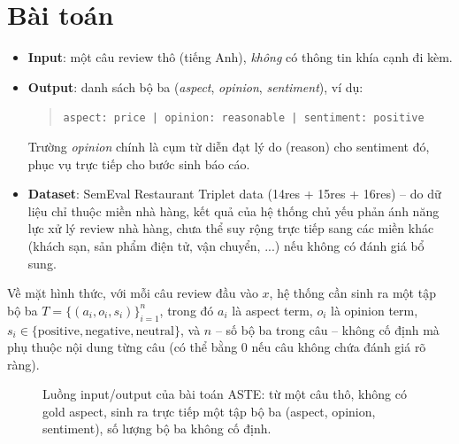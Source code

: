 \documentclass[11pt,a4paper]{article}
\begin{document}
\clearpage
\section{Bài toán}
\label{sec:problem}

\begin{itemize}
    \item \textbf{Input}: một câu review thô (tiếng Anh), \emph{không} có
        thông tin khía cạnh đi kèm.
    \item \textbf{Output}: danh sách bộ ba
        (\emph{aspect}, \emph{opinion}, \emph{sentiment}), ví dụ:
        \begin{quote}
        \texttt{aspect: price | opinion: reasonable | sentiment: positive}
        \end{quote}
        Trường \emph{opinion} chính là cụm từ diễn đạt lý do (reason)
        cho sentiment đó, phục vụ trực tiếp cho bước sinh báo cáo.
    \item \textbf{Dataset}: SemEval Restaurant Triplet data (14res +
        15res + 16res) -- do dữ liệu chỉ thuộc miền nhà hàng, kết quả của
        hệ thống chủ yếu phản ánh năng lực xử lý review nhà hàng, chưa
        thể suy rộng trực tiếp sang các miền khác (khách sạn, sản phẩm
        điện tử, vận chuyển, ...) nếu không có đánh giá bổ sung.
\end{itemize}

Về mặt hình thức, với mỗi câu review đầu vào $x$, hệ thống cần sinh ra
một tập bộ ba $T = \{(a_i, o_i, s_i)\}_{i=1}^{n}$, trong đó $a_i$ là
aspect term, $o_i$ là opinion term, $s_i \in \{\text{positive},
\text{negative}, \text{neutral}\}$, và $n$ -- số bộ ba trong câu -- không
cố định mà phụ thuộc nội dung từng câu (có thể bằng 0 nếu câu không chứa
đánh giá rõ ràng).

\begin{figure}[h]
\centering
{}
\caption{Luồng input/output của bài toán ASTE: từ một câu thô, không có
gold aspect, sinh ra trực tiếp một tập bộ ba (aspect, opinion,
sentiment), số lượng bộ ba không cố định.}
\end{figure}
\end{document}
